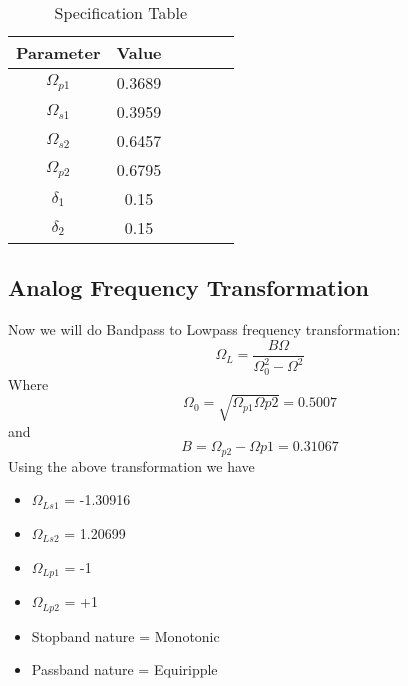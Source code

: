 \documentclass[12pt]{article}
\begin{document}
\begin{table}[h!]
		\begin{center}
		\caption{Specification Table}
		\begin{tabular}{|c|c|c|c|c|c|}
			\hline
			  Parameter & Value \\
			\hline
			 $\Omega_{p1}$& 0.3689\\
			\hline
			 $\Omega_{s1}$ & 0.3959\\
			\hline
			 $\Omega_{s2}$ & 0.6457\\
			\hline
		     $\Omega_{p2}$ & 0.6795\\
			\hline
		    $\delta_1$ & 0.15\\
		    \hline
		    $\delta_2$ & 0.15\\
		    \hline
		\end{tabular}
		\end{center}
\end{table}

\subsection{\textbf{Analog Frequency Transformation}}
Now we will do Bandpass to Lowpass frequency transformation:\\
\begin{equation*}
    \Omega_L = \frac{B\Omega}{\Omega_0^2-\Omega^2}
\end{equation*}
Where \\
\begin{equation*}
    \Omega_0 = \sqrt{\Omega_{p1}\Omega{p2}} = 0.5007
\end{equation*}
and\\
\begin{equation*}
    B = \Omega_{p2}-\Omega{p1} = 0.31067
\end{equation*}
Using the above transformation we have\\
\begin{itemize}
    \item $\Omega_{Ls1}$ = -1.30916
    \item $\Omega_{Ls2}$ = 1.20699
    \item $\Omega_{Lp1}$ = -1
    \item $\Omega_{Lp2}$ = +1
    \item Stopband nature = Monotonic
    \item Passband nature = Equiripple
\end{itemize}
\end{document}
